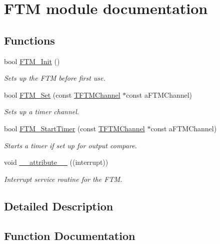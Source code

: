 \hypertarget{group___f_t_m__module}{}\section{F\+T\+M module documentation}
\label{group___f_t_m__module}
\subsection*{Functions}
\begin{DoxyCompactItemize}
\item 
bool \hyperlink{group___f_t_m__module_ga5f31811e067b5690d5f73c8e77019a6b}{F\+T\+M\+\_\+\+Init} ()
\begin{DoxyCompactList}\small\item\em Sets up the F\+T\+M before first use. \end{DoxyCompactList}\item 
bool \hyperlink{group___f_t_m__module_gae4928af832114c8173e43d10e4144c1f}{F\+T\+M\+\_\+\+Set} (const \hyperlink{struct_t_f_t_m_channel}{T\+F\+T\+M\+Channel} $\ast$const a\+F\+T\+M\+Channel)
\begin{DoxyCompactList}\small\item\em Sets up a timer channel. \end{DoxyCompactList}\item 
bool \hyperlink{group___f_t_m__module_gabb34a0dd79d879502fd81c0efa9440ec}{F\+T\+M\+\_\+\+Start\+Timer} (const \hyperlink{struct_t_f_t_m_channel}{T\+F\+T\+M\+Channel} $\ast$const a\+F\+T\+M\+Channel)
\begin{DoxyCompactList}\small\item\em Starts a timer if set up for output compare. \end{DoxyCompactList}\item 
void \hyperlink{group___f_t_m__module_ga445500277ba0e363873b34cffc015745}{\+\_\+\+\_\+attribute\+\_\+\+\_\+} ((interrupt))
\begin{DoxyCompactList}\small\item\em Interrupt service routine for the F\+T\+M. \end{DoxyCompactList}\end{DoxyCompactItemize}


\subsection{Detailed Description}


\subsection{Function Documentation}
\hypertarget{group___f_t_m__module_ga445500277ba0e363873b34cffc015745}{}
